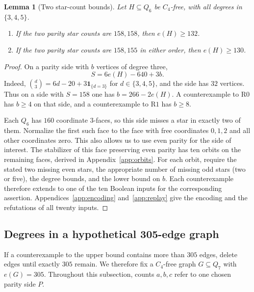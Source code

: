 \documentclass[11pt,reqno]{amsart}
\numberwithin{equation}{section}
\newtheorem{lemma}[theorem]{Lemma}
\newcommand{\one}{\mathbf{1}}
\begin{document}
\begin{lemma}[Two star-count bounds]\label{lem:rigid}
Let \(H\subseteq Q_6\) be \(C_4\)-free, with all degrees in
\(\{3,4,5\}\).
\begin{enumerate}
\item[\(\mathrm{R0}\).] If the two parity star counts are \(158,158\),
  then \(e(H)\ge132\).
\item[\(\mathrm{R1}\).] If the two parity star counts are \(158,155\)
  in either order, then \(e(H)\ge130\).
\end{enumerate}
\end{lemma}

\begin{proof}
On a parity side with \(b\) vertices of degree three,
\begin{equation}\label{eq:local-stars}
  S=6e(H)-640+3b.
\end{equation}
Indeed, \(\binom d3=6d-20+3\one_{\{d=3\}}\) for \(d\in\{3,4,5\}\),
and the side has \(32\) vertices. Thus on a side with \(S=158\) one
has \(b=266-2e(H)\). A counterexample to \(\mathrm{R0}\) has \(b\ge4\)
on that side, and a counterexample to \(\mathrm{R1}\) has \(b\ge8\).

Each \(Q_6\) has \(160\) coordinate \(3\)-faces, so this side misses
a star in exactly two of them. Normalize the first such face to the
face with free coordinates \(0,1,2\) and all other coordinates zero.
This also allows us to use even parity for the side of interest.
The stabilizer of this face preserving even parity has ten orbits on
the remaining faces, derived in Appendix~\ref{app:orbits}. For each
orbit, require the stated two missing even stars, the appropriate
number of missing odd stars (two or five), the degree bounds, and the
lower bound on \(b\). Each counterexample therefore extends to one
of the ten Boolean inputs for the corresponding assertion.
Appendices~\ref{app:encoding} and~\ref{app:replay} give the encoding
and the refutations of all twenty inputs.
\end{proof}

\subsection{Degrees in a hypothetical 305-edge graph}

If a counterexample to the upper bound contains more than \(305\)
edges, delete edges until exactly \(305\) remain. We therefore fix a
\(C_4\)-free graph \(G\subseteq Q_7\) with \(e(G)=305\). Throughout this
subsection, counts \(a,b,c\) refer to one chosen parity side \(P\).
\end{document}
